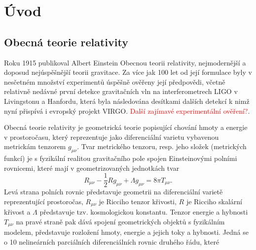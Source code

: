 \chapter*{Úvod}

\section*{Obecná teorie relativity}

Roku 1915 publikoval Albert Einstein Obecnou teorii relativity, nejmodernější a doposud nejúspěšnější teorii gravitace. Za více jak 100 let od její formulace byly v nesčetném množství
experimentů úspěšně ověřeny její předpovědi, včetně relativně nedávné první detekce gravitačních vln na interferometrech LIGO v Livingstonu a Hanfordu, která byla následována
desítkami dalších detekcí k nimž nyní přispívá i evropský projekt VIRGO. \textcolor{red}{Další zajímavé experimentální ověření?}.

Obecná teorie relativity je geometrická teorie popisující chování hmoty a energie v prostoročasu, který reprezentuje jako diferenciální varietu vybavenou metrickám tenzorem $g_{\mu \nu}$.
Tvar metrického tenzoru, resp. jeho složek (metrických funkcí) je s fyzikální realitou gravitačního pole spojen Einsteinovými polními rovnicemi, které mají v geometrizovaných jednotkách
tvar
\begin{equation}
    \label{eq:einsten_field_equations}
    R_{\mu \nu} - \frac{1}{2} R g_{\mu \nu} + \Lambda g_{\mu \nu} = 8 \pi T_{\mu \nu}.
\end{equation}
Levá strana polních rovnic představuje geometrii na diferenciální varietě reprezentující prostoročas, $R_{\mu \nu}$ je Ricciho tenzor křivosti, $R$ je Ricciho skalární křivost a $\Lambda$
představuje tzv. kosmologickou konstantu. Tenzor energie a hybnosti $T_{\mu \nu}$ na pravé straně pak dává spojení geometrických objektů s fyzikálním modelem, představuje rozložení hmoty,
energie a jejich toky a hybnosti. Jedná se o 10 nelineárních parciálních diferenciálních rovnic druhého řádu, které 